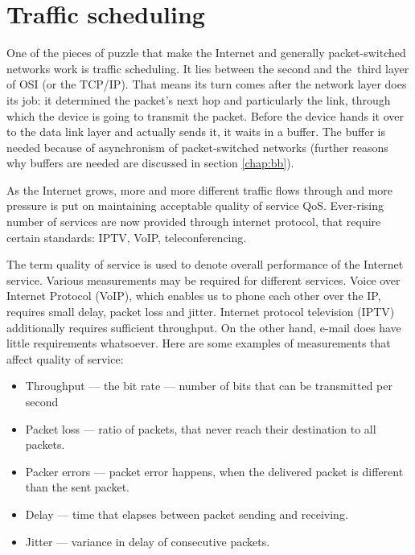\chapter{Traffic scheduling}
\label{chap:gf}

One of the pieces of puzzle that make the Internet and generally packet-switched networks work is traffic scheduling. It lies between the second and the~third layer of OSI (or the TCP/IP). That means its turn comes after the network layer does its job: it determined the packet's next hop and particularly the link, through which the device is going to transmit the packet. Before the device hands it over to the data link layer and actually sends it, it waits in a buffer. The buffer is needed because of asynchronism of packet-switched networks (further reasons why buffers are needed are discussed in section \ref{chap:bb}). 

As the Internet grows, more and more different traffic flows through and more pressure is put on maintaining acceptable quality of service QoS. Ever-rising number of services are now provided through internet protocol, that require certain standards: IPTV, VoIP, teleconferencing. %


The term quality of service is used to denote overall performance of the Internet service. Various measurements may be required for different services. Voice over Internet Protocol (VoIP), which enables us to phone each other over the IP, requires small delay, packet loss and jitter. Internet protocol television (IPTV) additionally requires sufficient throughput. On the other hand, e-mail does have little requirements whatsoever. Here are some examples of measurements that affect quality of service:
\begin{itemize}
	\item Throughput --- the bit rate --- number of bits that can be transmitted per second
	\item Packet loss --- ratio of packets, that never reach their destination to all packets.
	\item Packer errors --- packet error happens, when the delivered packet is different than the sent packet.
	\item Delay --- time that elapses between packet sending and receiving.
	\item Jitter --- variance in delay of consecutive packets.
\end{itemize}

